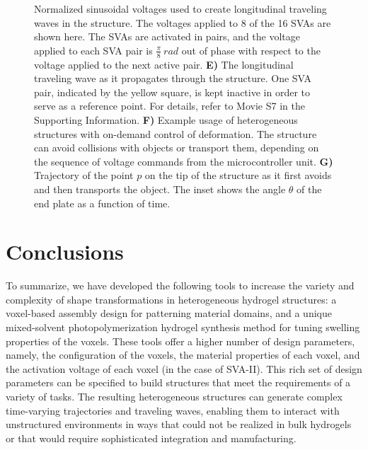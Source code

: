 \begin{figure}[t]
{Normalized sinusoidal voltages used to create longitudinal traveling waves in the structure. The voltages applied to 8 of the 16 SVAs are shown here. The SVAs are activated in pairs, and the voltage applied to each SVA pair is $\frac{\pi}{8}~rad$ out of phase with respect to the voltage applied to the next active pair. 
\textbf{E)} The longitudinal traveling wave as it propagates through the structure. One SVA pair, indicated by the yellow square, is kept inactive in order to serve as a reference point. For details, refer to Movie S7 in the Supporting Information. \textbf{F)} Example usage of heterogeneous structures with on-demand control of deformation. The structure can avoid collisions with objects or transport them, depending on the sequence of voltage commands from the microcontroller unit. \textbf{G)} Trajectory of the point $p$ on the tip of the structure as it first avoids and then transports the object. The inset shows the angle $\theta$ of the end plate as a function of time.}
\label{fig:4}
\end{figure}

\section{Conclusions}
To summarize, we have developed the following tools to increase the variety and complexity of shape transformations in heterogeneous hydrogel structures: a voxel-based assembly design for patterning material domains, and a unique mixed-solvent photopolymerization hydrogel synthesis method for tuning swelling properties of the voxels. These tools offer a higher number of design parameters, namely, the configuration of the voxels, the material properties of each voxel, and the activation voltage of each voxel (in the case of SVA-II). This rich set of design parameters can be specified to build structures that meet the requirements of a variety of tasks. The resulting heterogeneous structures can generate complex time-varying trajectories and traveling waves, enabling them to interact with unstructured environments in ways that could not be realized in bulk hydrogels or that would require sophisticated integration and manufacturing.\\

